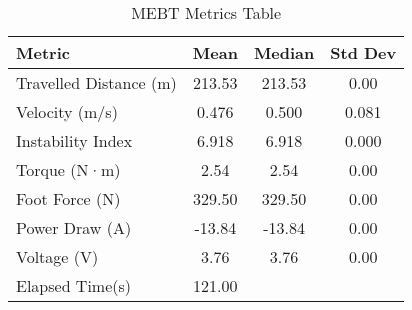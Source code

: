 \documentclass{article}
\begin{document}
\begin{table}[htbp]
\centering
\caption{MEBT Metrics Table}
\label{tab:simulation-metrics}
\begin{tabular}{@{} l S[table-format=3.2] S[table-format=3.2] S[table-format=1.3] @{}}
\toprule
\textbf{Metric} & \textbf{Mean} & \textbf{Median} & \textbf{Std Dev} \\
\midrule
Travelled Distance (m) & 213.53 & 213.53 & 0.00 \\
Velocity (m/s) & 0.476 & 0.500 & 0.081 \\
Instability Index & 6.918 & 6.918 & 0.000 \\
Torque (N·m) & 2.54 & 2.54 & 0.00 \\
Foot Force (N) & 329.50 & 329.50 & 0.00 \\
Power Draw (A) & -13.84 & -13.84 & 0.00 \\
Voltage (V) & 3.76 & 3.76 & 0.00 \\
Elapsed Time(s) & 121.00 \\

\bottomrule
\end{tabular}
\end{table}
\end{document}
